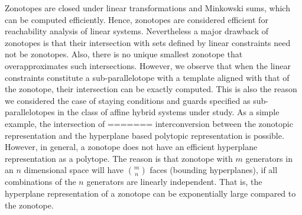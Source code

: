 Zonotopes are closed under linear transformations and Minkowski sums, which can be computed efficiently.  Hence, zonotopes are
considered efficient for reachability analysis of linear systems.  Nevertheless
a major drawback of zonotopes is that their intersection with sets defined by linear
constraints need not be zonotopes.  Also, there is no unique smallest
zonotope that overapproximates such intersections.  However, we observe that when the linear constraints
constitute a sub-parallelotope with a template aligned with that of
the zonotope, their intersection can be exactly computed.  This is
also the reason we considered the case of staying conditions and guards specified as sub-parallelotopes 
in the class of affine hybrid systems under study.  As a simple example, the intersection of
=======
interconversion between the zonotopic representation and the
hyperplane based polytopic representation is possible.  However, in
general, a zonotope does not have an efficient hyperplane
representation as a polytope.  The reason is that zonotope with $m$
generators in an $n$ dimensional space will have ${m}\choose{n}$ faces
(bounding hyperplanes), if all combinations of the $n$ generators are
linearly independent.  That is, the hyperplane representation of a
zonotope can be exponentially large compared to the zonotope.

